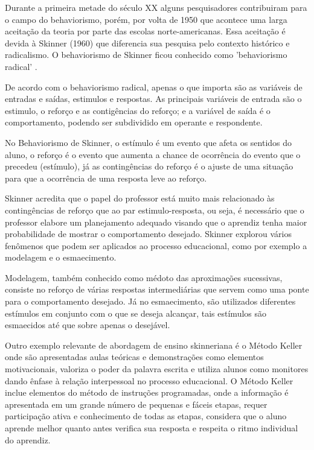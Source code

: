 Durante a primeira metade do século XX alguns pesquisadores contribuiram para o campo do behaviorismo, porém, por volta de 1950 que acontece uma larga aceitação da teoria por parte das escolas norte-americanas. Essa aceitação é devida à Skinner (1960) que diferencia sua pesquisa pelo contexto histórico e radicalismo. O behaviorismo de Skinner ficou conhecido como 'behaviorismo radical' \cite{fragelli2010, silva2005}.

De acordo com o behaviorismo radical, apenas o que importa são as variáveis de entradas e saídas, estimulos e respostas. As principais variáveis de entrada são o estimulo, o reforço e as contigências do reforço; e a variável de saída é o comportamento, podendo ser subdividido em operante e respondente.

No Behaviorismo de Skinner, o estímulo é um evento que afeta os sentidos do aluno, o reforço é o evento que aumenta a chance de ocorrência do evento que o precedeu (estímulo), já as contingências do reforço é o ajuste de uma situação para que a ocorrência de uma resposta leve ao reforço.

Skinner acredita que o papel do professor está muito mais relacionado às contingências de reforço que ao par estimulo-resposta, ou seja, é necessário que o professor elabore um planejamento adequado visando que o aprendiz tenha maior probabilidade de mostrar o comportamento desejado. Skinner explorou vários fenômenos que podem ser aplicados ao processo educacional, como por exemplo a modelagem e o esmaecimento.

Modelagem, também conhecido como médoto das aproximações sucessivas, consiste no reforço de várias respostas intermediárias que servem como uma ponte para o comportamento desejado. Já no esmaecimento, são utilizados diferentes estímulos em conjunto com o que se deseja alcançar, tais estímulos são esmaecidos até que sobre apenas o desejável.

Outro exemplo relevante de abordagem de ensino skinneriana é o Método Keller onde são apresentadas aulas teóricas e demonstrações como elementos motivacionais, valoriza o poder da palavra escrita e utiliza alunos como monitores dando ênfase à relação interpessoal no processo educacional. O Método Keller inclue elementos do método de instruções programadas, onde a informação é apresentada em um grande número de pequenas e fáceis etapas, requer participação ativa e conhecimento de todas as etapas, considera que o aluno aprende melhor quanto antes verifica sua resposta e respeita o ritmo individual do aprendiz.

